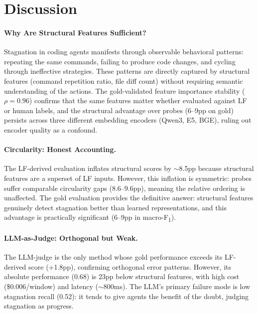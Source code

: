 \documentclass[11pt,a4paper]{article}
\newcommand{\fone}{F\textsubscript{1}}
\begin{document}
\section{Discussion}
\label{sec:discussion}

\paragraph{Why Are Structural Features Sufficient?}
Stagnation in coding agents manifests through observable behavioral patterns: repeating the same commands, failing to produce code changes, and cycling through ineffective strategies.
These patterns are directly captured by structural features (command repetition ratio, file diff count) without requiring semantic understanding of the actions.
The gold-validated feature importance stability ($\rho{=}0.96$) confirms that the same features matter whether evaluated against LF or human labels, and the structural advantage over probes (6--9pp on gold) persists across three different embedding encoders (Qwen3, E5, BGE), ruling out encoder quality as a confound.

\paragraph{Circularity: Honest Accounting.}
The LF-derived evaluation inflates structural scores by $\sim$8.5pp because structural features are a superset of LF inputs.
However, this inflation is symmetric: probes suffer comparable circularity gaps (8.6--9.6pp), meaning the relative ordering is unaffected.
The gold evaluation provides the definitive answer: structural features genuinely detect stagnation better than learned representations, and this advantage is practically significant (6--9pp in macro-\fone{}).

\paragraph{LLM-as-Judge: Orthogonal but Weak.}
The LLM-judge is the only method whose gold performance exceeds its LF-derived score (+1.8pp), confirming orthogonal error patterns.
However, its absolute performance (0.68) is 23pp below structural features, with high cost (\$0.006/window) and latency ($\sim$800ms).
The LLM's primary failure mode is low stagnation recall (0.52): it tends to give agents the benefit of the doubt, judging stagnation as progress.
\end{document}
